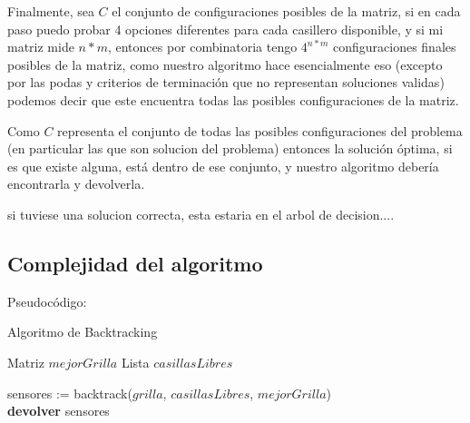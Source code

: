 Finalmente, sea $C$ el conjunto de configuraciones posibles de la matriz, si en cada paso puedo probar 4 opciones diferentes para cada casillero disponible, y si mi matriz mide $n*m$, entonces por combinatoria tengo $4^{n*m}$ configuraciones finales posibles de la matriz, como nuestro algoritmo hace esencialmente eso (excepto por las podas y criterios de terminación que no representan soluciones validas) podemos decir que este encuentra todas las posibles configuraciones de la matriz.

Como $C$ representa el conjunto de todas las posibles configuraciones del problema (en particular las que son solucion del problema) entonces la solución óptima, si es que existe alguna, está dentro de ese conjunto, y nuestro algoritmo debería encontrarla y devolverla.

si tuviese una solucion correcta, esta estaria en el arbol de decision....

\subsection{Complejidad del algoritmo}

Pseudocódigo:

\begin{algorithm}[H]
	\SetAlgoLined
	\caption{Algoritmo de Backtracking}
	
	Matriz $mejorGrilla$
	Lista $casillasLibres$\\


	sensores := backtrack($grilla$, $casillasLibres$, $mejorGrilla$)\\

	\textbf{devolver} sensores
\end{algorithm}

